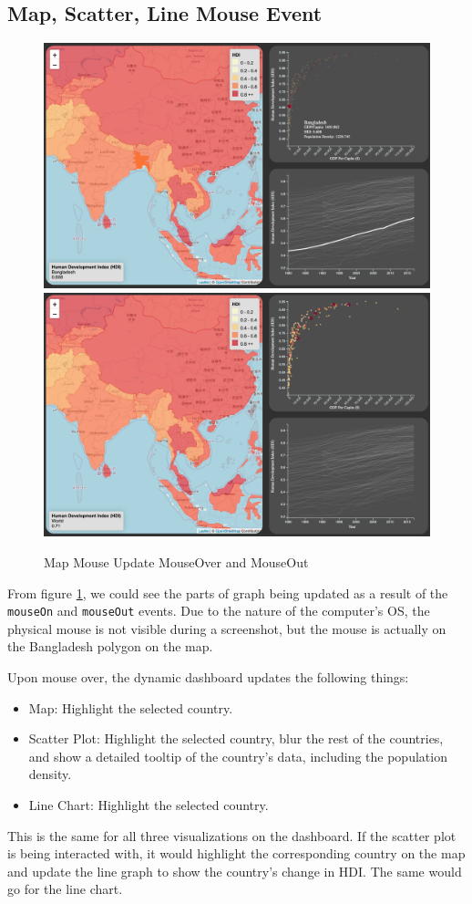 \documentclass{scrreprt}
\begin{document}
\subsection{Map, Scatter, Line Mouse Event}
\begin{figure}[H]
    \centering
    \includegraphics[height = 0.3\textwidth]{images/map_mouse_1.png}
    \includegraphics[height = 0.3\textwidth]{images/map_mouse_2.png}
    \label{fig:map-mouse-update}
    \caption{Map Mouse Update MouseOver and MouseOut}
\end{figure}
From figure \ref{fig:map-mouse-update}, we could see the parts of graph being updated as a result of the \verb|mouseOn| and \verb|mouseOut| events. Due to the nature of the computer's OS, the physical mouse is not visible during a screenshot, but the mouse is actually on the Bangladesh polygon on the map. 

Upon mouse over, the dynamic dashboard updates the following things:
\begin{itemize}
    \item Map: Highlight the selected country.
    \item Scatter Plot: Highlight the selected country, blur the rest of the countries, and show a detailed tooltip of the country's data, including the population density. 
    \item Line Chart: Highlight the selected country.
\end{itemize}

This is the same for all three visualizations on the dashboard. If the scatter plot is being interacted with, it would highlight the corresponding country on the map and update the line graph to show the country's change in HDI. The same would go for the line chart. 
\end{document}
